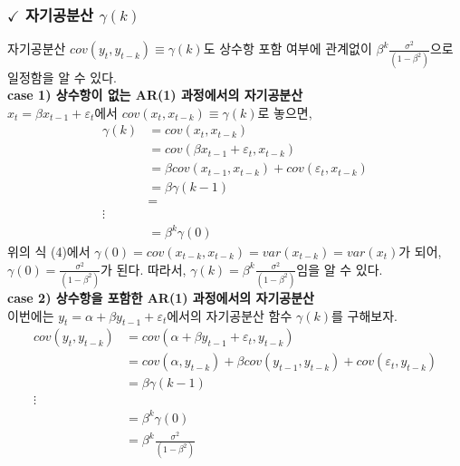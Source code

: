 \documentclass{article}
\begin{document}
\subsubsection*{$\checkmark$ 자기공분산 $\gamma(k)$}
자기공분산 $cov(y_t, y_{t-k}) \equiv \gamma(k)$도 상수항 포함 여부에 관계없이 $\beta^{k}\frac{\sigma^2}{(1-\beta^2)}$으로 일정함을 알 수 있다.\\
\textbf{case 1) 상수항이 없는 AR(1) 과정에서의 자기공분산}\\
$x_t = \beta x_{t-1} + \varepsilon_t$에서 $cov(x_{t}, x_{t-k}) \equiv \gamma(k)$로 놓으면,
\begin{equation}
\begin{aligned}
\gamma(k) &= cov(x_{t}, x_{t-k})\\
          &= cov(\beta x_{t-1} + \varepsilon_t, x_{t-k})\\
          &= \beta cov(x_{t-1}, x_{t-k}) + cov(\varepsilon_t, x_{t-k})\\
          &= \beta\gamma(k-1)\\
          &= \\
          \vdots \\
          &= \beta^{k}\gamma(0)     
\end{aligned}  
\end{equation}
위의 식 (4)에서 $\gamma(0) = cov(x_{t-k},x_{t-k}) = var(x_{t-k}) = var(x_t)$가 되어,\\
$\gamma(0) = \frac{\sigma^2}{(1-\beta^{2})}$가 된다. 따라서, $\gamma(k) = \beta^{k}\frac{\sigma^2}{(1-\beta^2)}$임을 알 수 있다.\\
\textbf{case 2) 상수항을 포함한 AR(1) 과정에서의 자기공분산}\\
이번에는 $y_t = \alpha + \beta y_{t-1} + \varepsilon_t$에서의 자기공분산 함수 $\gamma(k)$를 구해보자.\\
\begin{equation}
\begin{aligned}
cov(y_{t}, y_{t-k}) &= cov(\alpha + \beta y_{t-1} + \varepsilon_t, y_{t-k})\\
                    &= cov(\alpha, y_{t-k}) + \beta cov(y_{t-1}, y_{t-k}) + cov(\varepsilon_t, y_{t-k})\\
                    &= \beta\gamma(k-1)\\
                    \vdots \\
                    &= \beta^{k}\gamma(0)\\
                    &= \beta^{k}\frac{\sigma^2}{(1-\beta^2)}   
\end{aligned}
\end{equation}
\newpage
\end{document}
